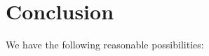 \documentclass[a4paper
,draft
]{article}
\newcommand{\svn}[2][]{\todo[author=Virgil,color=red!25!white,#1]{#2}}
\def\reale{\mathbb{R}}
\newcommand{\ghilimele}[1]{``#1"}
\begin{document}







\section{Conclusion}

We have the following reasonable possibilities:
\end{document}
